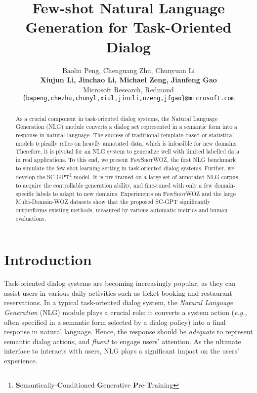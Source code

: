 \documentclass[11pt,a4paper]{article}
\title{Few-shot Natural Language Generation for Task-Oriented Dialog}
\author{Baolin Peng, Chenguang Zhu, Chunyuan Li \\ \textbf{Xiujun Li, Jinchao Li, Michael Zeng, Jianfeng Gao} \\
  Microsoft Research, Redmond \\
\texttt{\{bapeng,chezhu,chunyl,xiul,jincli,nzeng,jfgao\}@microsoft.com}
 }
\date{}
\newcommand{\eg}[0]{\emph{e.g., }}
\newcommand{\data}{\textsc{FewShotWOZ}}
\begin{document}
\maketitle
\begin{abstract}
As a crucial component in task-oriented dialog systems, the Natural Language Generation (NLG) module converts a dialog act represented in a semantic form into a response in natural language. The success of traditional template-based or statistical models typically relies on heavily annotated data, which is infeasible for new domains.
Therefore, it is pivotal for an NLG system to generalize well with limited labelled data in real applications. To this end, we present \data{}, the first NLG benchmark to simulate the few-shot learning setting in task-oriented dialog systems. Further, we develop the SC-GPT\footnote{{\bf S}emantically-{\bf C}onditioned {\bf G}enerative {\bf P}re-{\bf T}raining} model. It is pre-trained on a large set of annotated NLG corpus to acquire the controllable generation ability, and fine-tuned with only a few domain-specific labels 
to adapt to new domains. 
Experiments on \data{} and the large Multi-Domain-WOZ datasets show that the proposed SC-GPT significantly outperforms existing methods, measured by various automatic metrics and human evaluations.
\end{abstract}



\section{Introduction}

Task-oriented dialog systems are becoming increasingly popular, as they can assist users in various daily activities such as ticket booking and restaurant reservations. In a typical task-oriented dialog system, the {\it Natural Language Generation} (NLG) module plays a crucial role: it converts a system action (\eg often specified in a semantic form selected by a dialog policy) into a final response in natural language. 
Hence, the response should be 
{\it adequate} to represent semantic dialog actions, and 
{\it fluent} to engage users' attention. As the ultimate interface to interacts with users, NLG plays a significant impact on the users' experience.
\end{document}
